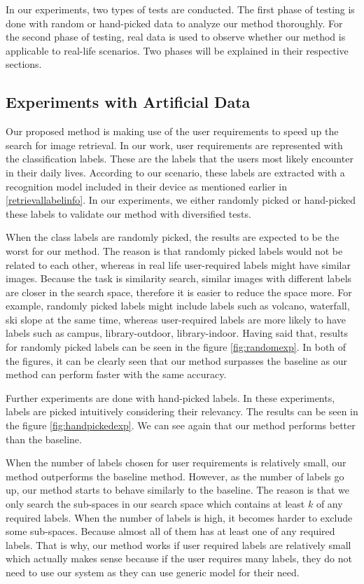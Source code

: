 In our experiments, two types of tests are conducted. 
The first phase of testing is done with random or hand-picked data to analyze our method thoroughly. 
For the second phase of testing, real data is used to observe whether our method is applicable to real-life scenarios. 
Two phases will be explained in their respective sections.

\subsection*{Experiments with Artificial Data}

Our proposed method is making use of the user requirements to speed up the search for image retrieval. 
In our work, user requirements are represented with the classification labels. 
These are the labels that the users most likely encounter in their daily lives. 
According to our scenario, these labels are extracted with a recognition model included in their device as mentioned earlier in \ref{retrievallabelinfo}. 
In our experiments, we either randomly picked or hand-picked these labels to validate our method with diversified tests.

When the class labels are randomly picked, the results are expected to be the worst for our method. 
The reason is that randomly picked labels would not be related to each other, whereas in real life user-required labels might have similar images. 
Because the task is similarity search, similar images with different labels are closer in the search space, therefore it is easier to reduce the space more.
For example, randomly picked labels might include labels such as volcano, waterfall, ski slope at the same time, whereas user-required labels are more likely to have labels such as campus, library-outdoor, library-indoor.
Having said that, results for randomly picked labels can be seen in the figure \ref{fig:randomexp}.
In both of the figures, it can be clearly seen that our method surpasses the baseline as our method can perform faster with the same accuracy.

Further experiments are done with hand-picked labels. 
In these experiments, labels are picked intuitively considering their relevancy. 
The results can be seen in the figure \ref{fig:handpickedexp}. 
We can see again that our method performs better than the baseline.

When the number of labels chosen for user requirements is relatively small, our method outperforms the baseline method.
However, as the number of labels go up, our method starts to behave similarly to the baseline.
The reason is that we only search the sub-spaces in our search space which contains at least $k$ of any required labels. 
When the number of labels is high, it becomes harder to exclude some sub-spaces. Because almost all of them has at least one of any required labels. 
That is why, our method works if user required labels are relatively small which actually makes sense because if the user requires many labels, they do not need to use our system as they can use generic model for their need.


